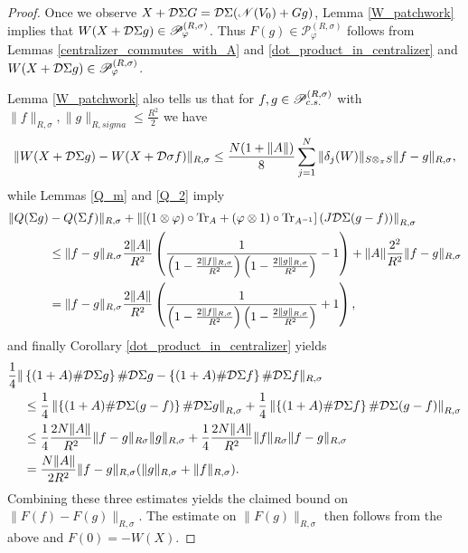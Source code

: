 \begin{proof}
Once we observe $X+\D\Sigma G = \D \Sigma( \mathscr{N}(V_0) + Gg)$, Lemma \ref{W_patchwork} implies that $W(X+\D\Sigma g)\in \P_\varphi^{(R,\sigma)}$. Thus $F(g)\in \mathscr{P}_\varphi^{(R,\sigma)}$ follows from Lemmas \ref{centralizer_commutes_with_A} and \ref{dot_product_in_centralizer} and $W(X+\D\Sigma g)\in\mathscr{P}^{(R,\sigma)}_\varphi$.

Lemma \ref{W_patchwork} also tells us that for $f,g\in \P_{c.s.}^{(R,\sigma)}$ with $\|f\|_{R,\sigma},\|g\|_{R,sigma}\leq \frac{R^2}{2}$ we have
	\begin{align*}
		\| W(X+\D\Sigma g) - W(X+\D\sigma f)\|_{R,\sigma} \leq \frac{N(1+\|A\|)}{8} \sum_{j=1}^N \|\delta_j(W)\|_{S\otimes_\pi S} \| f-g\|_{R,\sigma},
	\end{align*}
while Lemmas \ref{Q_m} and \ref{Q_2} imply
	\begin{align*}
		 \| Q(\Sigma g)&-Q(\Sigma f)\|_{R,\sigma} + \left\| \left[(1\otimes\varphi)\circ\text{Tr}_{A}+(\varphi\otimes 1)\circ\text{Tr}_{A^{-1}}\right](J\D\Sigma (g-f))\right\|_{R,\sigma}\\
					        &\leq  \|f-g\|_{R,\sigma}\frac{2\|A\|}{R^2} \left( \frac{1}{\left(1-\frac{2\|f\|_{R,\sigma}}{R^2}\right)\left(1-\frac{2\|g\|_{R,\sigma}}{R^2}\right)} - 1\right) +\|A\| \frac{2^2}{R^2} \|f-g\|_{R,\sigma} \\
						&= \|f-g\|_{R,\sigma}\frac{2\|A\|}{R^2} \left( \frac{1}{\left(1-\frac{2\|f\|_{R,\sigma}}{R^2}\right)\left(1-\frac{2\|g\|_{R,\sigma}}{R^2}\right)} + 1\right),
	\end{align*}
and finally Corollary \ref{dot_product_in_centralizer} yields
	\begin{align*}
		\frac{1}{4}\| &\left\{(1+A)\#\D\Sigma g\right\} \#\D\Sigma g - \left\{(1+A)\#\D\Sigma f\right\} \#\D\Sigma f \|_{R,\sigma}\\
					 &\leq \frac{1}{4} \left\| \left\{(1+A)\#\D\Sigma (g-f)\right\} \#\D\Sigma g\right\|_{R,\sigma} + \frac{1}{4} \left\| \left\{(1+A)\#\D\Sigma f\right\} \#\D\Sigma (g-f)\right\|_{R,\sigma}\\
					 &\leq \frac{1}{4} \frac{2N\|A\|}{R^2}\| f-g\|_{R\sigma}\|g\|_{R,\sigma} + \frac{1}{4} \frac{2N\|A\|}{R^2}\| f\|_{R\sigma}\|f-g\|_{R,\sigma}\\
					 &= \frac{N\|A\|}{2R^2}\|f-g\|_{R,\sigma} (\|g\|_{R,\sigma}+\|f\|_{R,\sigma}).
	\end{align*}
Combining these three estimates yields the claimed bound on $\|F(f) - F(g)\|_{R,\sigma}$. The estimate on $\|F(g)\|_{R,\sigma}$ then follows from the above and $F(0)=-W(X)$.\par

\end{proof}
